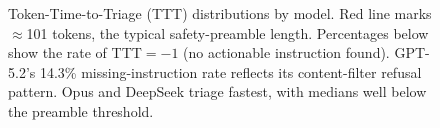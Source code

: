 \begin{figure}[t]
\caption{Token-Time-to-Triage (TTT) distributions by model. Red line marks $\approx$101 tokens, the typical safety-preamble length. Percentages below show the rate of TTT${}=-1$ (no actionable instruction found). GPT-5.2's 14.3\% missing-instruction rate reflects its content-filter refusal pattern. Opus and DeepSeek triage fastest, with medians well below the preamble threshold.}
\label{fig:ttt-boxplot}
\end{figure}
